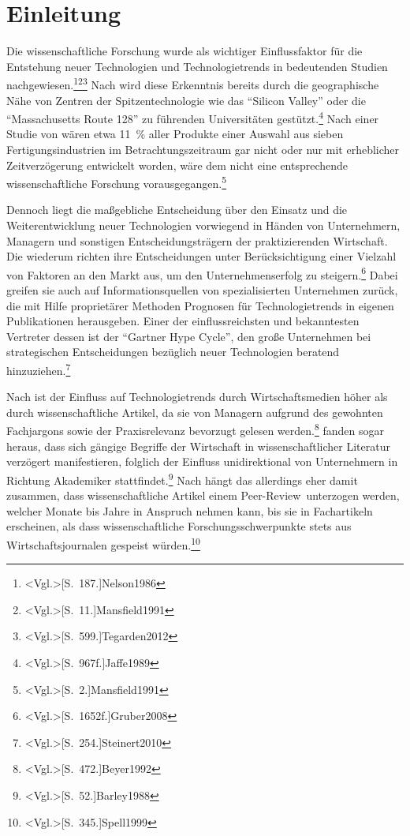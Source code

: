 \section{Einleitung}
Die wissenschaftliche Forschung wurde als wichtiger Einflussfaktor für die Entstehung neuer Technologien und Technologietrends in bedeutenden Studien nachgewiesen.\footnote{\citeNP<Vgl.>[S.~187.]{Nelson1986}}\footnote{\citeNP<Vgl.>[S.~11.]{Mansfield1991}}\footnote{\citeNP<Vgl.>[S.~599.]{Tegarden2012}}
Nach  wird diese Erkenntnis bereits durch die geographische Nähe von Zentren der Spitzentechnologie wie das "`Silicon Valley"' oder die "`Massachusetts Route 128"' zu führenden Universitäten gestützt.\footnote{\citeNP<Vgl.>[S.~967f.]{Jaffe1989}} Nach einer Studie von  wären etwa 11~\% aller Produkte einer Auswahl aus sieben Fertigungsindustrien im Betrachtungszeitraum gar nicht oder nur mit erheblicher Zeitverzögerung entwickelt worden, wäre dem nicht eine entsprechende wissenschaftliche Forschung vorausgegangen.\footnote{\citeNP<Vgl.>[S.~2.]{Mansfield1991}}

Dennoch liegt die maßgebliche Entscheidung über den Einsatz und die Weiterentwicklung neuer Technologien vorwiegend in Händen von Unternehmern, Managern und sonstigen Entscheidungsträgern der praktizierenden Wirtschaft. Die wiederum richten ihre Entscheidungen unter Berücksichtigung einer Vielzahl von Faktoren an den Markt aus, um den Unternehmenserfolg zu steigern.\footnote{\citeNP<Vgl.>[S.~1652f.]{Gruber2008}} Dabei greifen sie auch auf Informationsquellen von spezialisierten Unternehmen zurück, die mit Hilfe proprietärer Methoden Prognosen für Technologietrends in eigenen Publikationen herausgeben. Einer der einflussreichsten und bekanntesten Vertreter dessen ist der "`Gartner Hype Cycle"', den große Unternehmen bei strategischen Entscheidungen bezüglich neuer Technologien beratend hinzuziehen.\footnote{\citeNP<Vgl.>[S.~254.]{Steinert2010}}

Nach  ist der Einfluss auf Technologietrends durch Wirtschaftsmedien höher als durch wissenschaftliche Artikel, da sie von Managern aufgrund des gewohnten Fachjargons sowie der Praxisrelevanz bevorzugt gelesen werden.\footnote{\citeNP<Vgl.>[S.~472.]{Beyer1992}}  fanden sogar heraus, dass sich gängige Begriffe der Wirtschaft in wissenschaftlicher Literatur verzögert manifestieren, folglich der Einfluss unidirektional von Unternehmern in Richtung Akademiker stattfindet.\footnote{\citeNP<Vgl.>[S.~52.]{Barley1988}} Nach  hängt das allerdings eher damit zusammen, dass wissenschaftliche Artikel einem \glqq Peer-Review\grqq~unterzogen werden, welcher Monate bis Jahre in Anspruch nehmen kann, bis sie in Fachartikeln erscheinen, als dass wissenschaftliche Forschungsschwerpunkte stets aus Wirtschaftsjournalen gespeist würden.\footnote{\citeNP<Vgl.>[S.~345.]{Spell1999}}

